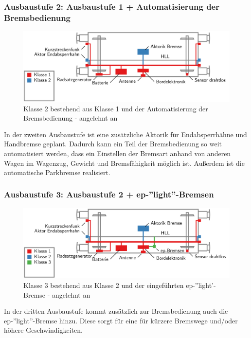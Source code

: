 \subsubsection{Ausbaustufe 2: Ausbaustufe 1 + Automatisierung der Bremsbedienung}
\begin{figure}[htbp] 
    \includegraphics[width=\textwidth]{Bilder/Ausbaustufen_2.PNG}
    \caption{Klasse 2 bestehend aus Klasse 1 und der Automatisierung der Bremsbedienung - angelehnt an \cite{ETR_3}}
    \label{fig:Klasse2}
\end{figure} 
In der zweiten Ausbaustufe ist eine zusätzliche Aktorik für Endabsperrhähne und Handbremse geplant. Dadurch kann ein Teil der Bremsbedienung so weit automatisiert werden, dass ein Einstellen der Bremsart anhand von anderen Wagen im Wagenzug, Gewicht und Bremsfähigkeit möglich ist. Außerdem ist die automatische Parkbremse realisiert.\par
\subsubsection{Ausbaustufe 3: Ausbaustufe 2 + ep-''light''-Bremsen}
\begin{figure}[htbp] 
    \includegraphics[width=\textwidth]{Bilder/Ausbaustufen_3.PNG}
    \caption{Klasse 3 bestehend aus Klasse 2 und der eingeführten ep-''light'-Bremse - angelehnt an \cite{ETR_3}}
    \label{fig:Klasse3}
\end{figure} 
In der dritten Ausbaustufe kommt zusätzlich zur Bremsbedienung auch die ep-''light''-Bremse hinzu. Diese sorgt für eine für kürzere Bremswege und/oder höhere Geschwindigkeiten.\par
